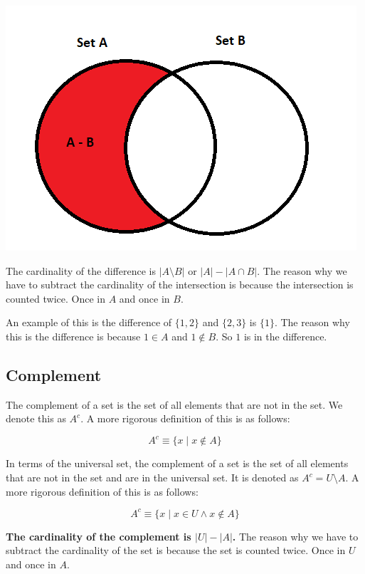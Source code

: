 \documentclass[11pt]{article}
\begin{document}
\begin{center}
\includegraphics[width=.9\linewidth]{Set_Theory/2022-12-06_09-56-18_Set-Difference.png}
\end{center}



The cardinality of the difference is \(|A \setminus B|\) or \(|A| - |A \cap B|\). The reason why we have to subtract the cardinality of the intersection is because the intersection is counted twice. Once in \(A\) and once in \(B\).

An example of this is the difference of \(\{1,2\}\) and \(\{2,3\}\) is \(\{1\}\). The reason why this is the difference is because \(1 \in A\) and \(1 \notin B\). So \(1\) is in the difference.

\subsection{Complement}
\label{sec:org0891bd1}
The complement of a set is the set of all elements that are not in the set. We denote this as \(A^c\). A more rigorous definition of this is as follows:

\[
A^c \equiv \{x \mid x \notin A\}
\]

In terms of the universal set, the complement of a set is the set of all elements that are not in the set and are in the universal set. It is denoted as \(A^c = U \setminus A\). A more rigorous definition of this is as follows:

\[
A^c \equiv \{x \mid x \in U \land x \notin A\}
\]

\textbf{The cardinality of the complement is \(|U| - |A|\).} The reason why we have to subtract the cardinality of the set is because the set is counted twice. Once in \(U\) and once in \(A\).
\end{document}
